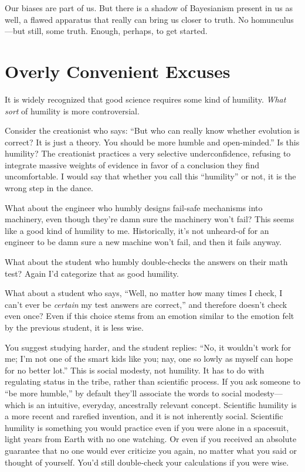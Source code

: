 {
 Our biases are part of us. But there is a shadow of Bayesianism
present in us as well, a flawed apparatus that really can bring us
closer to truth. No homunculus---but still, some truth. Enough,
perhaps, to get started.}

\myendsectiontext

\chapter{Overly Convenient Excuses}


{
 It is widely recognized that good science requires some kind of
humility. \textit{What sort} of humility is more controversial. }

{
 Consider the creationist who says: ``But who can
really know whether evolution is correct? It is just a theory. You
should be more humble and open-minded.'' Is this
humility? The creationist practices a very selective underconfidence,
refusing to integrate massive weights of evidence in favor of a
conclusion they find uncomfortable. I would say that whether you call
this ``humility'' or not, it is the
wrong step in the dance.}

{
 What about the engineer who humbly designs fail-safe mechanisms
into machinery, even though they're damn sure the
machinery won't fail? This seems like a good kind of
humility to me. Historically, it's not unheard-of for
an engineer to be damn sure a new machine won't fail,
and then it fails anyway.}

{
 What about the student who humbly double-checks the answers on
their math test? Again I'd categorize that as good
humility.}

{
 What about a student who says, ``Well, no matter
how many times I check, I can't ever be
\textit{certain} my test answers are correct,'' and
therefore doesn't check even once? Even if this choice
stems from an emotion similar to the emotion felt by the previous
student, it is less wise.}

{
 You suggest studying harder, and the student replies:
``No, it wouldn't work for me;
I'm not one of the smart kids like you; nay, one so
lowly as myself can hope for no better lot.'' This is
social modesty, not humility. It has to do with regulating status in
the tribe, rather than scientific process. If you ask someone to
``be more humble,'' by default
they'll associate the words to social modesty---which
is an intuitive, everyday, ancestrally relevant concept. Scientific
humility is a more recent and rarefied invention, and it is not
inherently social. Scientific humility is something you would practice
even if you were alone in a spacesuit, light years from Earth with no
one watching. Or even if you received an absolute guarantee that no one
would ever criticize you again, no matter what you said or thought of
yourself. You'd still double-check your calculations if
you were wise.}

